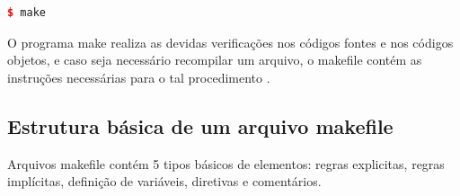 \begin{lstlisting}[language=C++,caption={
                             Chamada de sistema para executar o programa make},
				                                                label=codigo_20]
    $ make
\end{lstlisting}


O programa make realiza as devidas verificações nos códigos fontes e
 nos códigos objetos, e caso seja necessário recompilar um arquivo, o
 makefile contém as instruções necessárias para o tal procedimento
 \cite{ref46}.


\subsection{Estrutura básica de um arquivo makefile}

Arquivos makefile contém 5 tipos básicos de elementos: regras explicitas,
 regras implícitas, definição de variáveis, diretivas e comentários.

